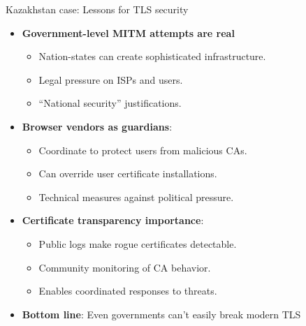 \documentclass[aspectratio=169, lualatex, handout]{beamer}
\begin{document}
\begin{frame}{Kazakhstan case: Lessons for TLS security}
	\begin{itemize}[<+->]
		\item \textbf{Government-level MITM attempts are real}
		      \begin{itemize}
			      \item Nation-states can create sophisticated infrastructure.
			      \item Legal pressure on ISPs and users.
			      \item ``National security'' justifications.
		      \end{itemize}
		\item \textbf{Browser vendors as guardians}:
		      \begin{itemize}
			      \item Coordinate to protect users from malicious CAs.
			      \item Can override user certificate installations.
			      \item Technical measures against political pressure.
		      \end{itemize}
		\item \textbf{Certificate transparency importance}:
		      \begin{itemize}
			      \item Public logs make rogue certificates detectable.
			      \item Community monitoring of CA behavior.
			      \item Enables coordinated responses to threats.
		      \end{itemize}
		\item \textbf{Bottom line}: Even governments can't easily break modern TLS
	\end{itemize}
\end{frame}
\end{document}
